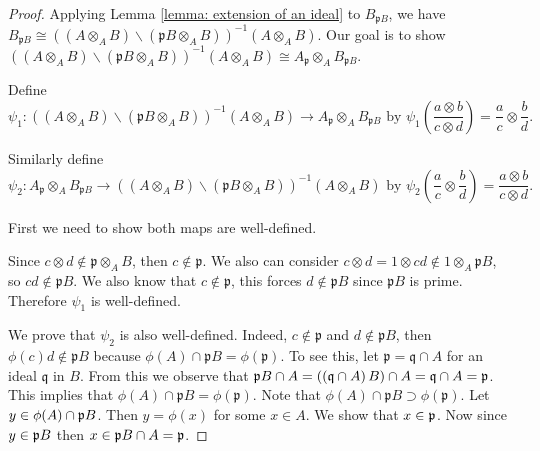 \documentclass[12pt]{amsart}
\numberwithin{equation}{section}
\theoremstyle{definition}
\def\pp{{\frak p}}
\begin{document}
	\begin{proof}
	Applying Lemma \ref{lemma: extension of an ideal} to $B_{\mathfrak{p}B}$, we have $B_{\mathfrak{p}B} \cong ( (A \otimes_A B) \backslash (\mathfrak{p}B \otimes_A B) )^{-1} (A \otimes_A B)$. Our goal is to show $( (A \otimes_A B) \backslash (\mathfrak{p}B \otimes_A B) )^{-1} (A \otimes_A B) \cong A_{\mathfrak{p}} \otimes_A B_{\mathfrak{p}B}$.
	
	Define $$\psi_1 : ( (A \otimes_A B) \backslash (\mathfrak{p}B \otimes_A B) )^{-1} (A \otimes_A B) \rightarrow A_{\mathfrak{p}} \otimes_A B_{\mathfrak{p}B} \text{ by } \psi_1\left(\frac{a \otimes b}{c \otimes d}\right) = \frac{a}{c} \otimes \frac{b}{d}.   $$ %
	
	Similarly define  $$ \psi_2 : A_{\mathfrak{p}} \otimes_A B_{\mathfrak{p}B} \rightarrow ( (A \otimes_A B) \backslash (\mathfrak{p}B \otimes_A B) )^{-1} (A \otimes_A B) \text{ by } \psi_2\left(\frac{a}{c} \otimes \frac{b}{d}\right) = \frac{a \otimes b}{c \otimes d}.$$ %
	
	First we need to show both maps are well-defined. 
	
	Since $c \otimes d \notin \mathfrak{p} \otimes_A B$, then $c \notin \mathfrak{p}$. We also can consider $c \otimes d = 1 \otimes cd \notin 1 \otimes_A \mathfrak{p}B$, so $cd \notin \mathfrak{p}B$. We also know that $c \notin \mathfrak{p}$, this forces $d \notin \mathfrak{p}B$ since $\mathfrak{p}B$ is prime. Therefore $\psi_1$ is well-defined.
	
 We prove that	$\psi_2$ is also well-defined. Indeed, $c \notin \mathfrak{p}$ and $d \notin \mathfrak{p}B$, then $\phi(c)d \notin \mathfrak{p}B$ because $\phi(A) \cap \mathfrak{p}B = \phi(\mathfrak{p})$. To see this, let $\mathfrak{p} = \mathfrak{q}\cap A$ for an ideal $\mathfrak{q}$ in $B$. From this we  observe that $\mathfrak{p}B\cap A  = \left( \left( \mathfrak{q}\cap A\right) B\right) \cap A  = \mathfrak{q}\cap A=\pp$. This implies that $\phi(A) \cap \mathfrak{p}B = \phi(\mathfrak{p})$. Note that $\phi(A) \cap \mathfrak{p}B \supset \phi(\mathfrak{p})$. Let $y \in \phi(A)\cap \pp B$. Then $y=\phi(x)$ for some $x\in A$. We show that $x \in \pp$. Now since $y \in \pp B$ then $x\in \pp B\cap A=\pp$. 
 

\end{proof}
\end{document}
